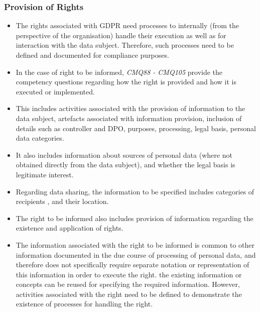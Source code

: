 \subsubsection{Provision of Rights}
\begin{itemize}
    \item The rights associated with GDPR need processes to internally (from the perspective of the organisation) handle their execution as well as for interaction with the data subject. Therefore, such processes need to be defined and documented for compliance purposes.
    \item In the case of right to be informed, \textit{CMQ88 - CMQ105} provide the competency questions regarding how the right is provided and how it is executed or implemented.
    \item This includes activities associated with the provision of information to the data subject, artefacts associated with information provision, inclusion of details such as controller and DPO, purposes, processing, legal basis, personal data categories.
    \item It also includes information about sources of personal data (where not obtained directly from the data subject), and whether the legal basis is legitimate interest.
    \item Regarding data sharing, the information to be specified includes categories of recipients , and their location.
    \item The right to be informed also includes provision of information regarding the existence and application of rights.
    \item The information associated with the right to be informed is common to other information documented in the due course of processing of personal data, and therefore does not specifically require separate notation or representation of this information in order to execute the right. the existing information or concepts can be reused for specifying the required information. However, activities associated with the right need to be defined to demonstrate the existence of processes for handling the right.
\end{itemize}

